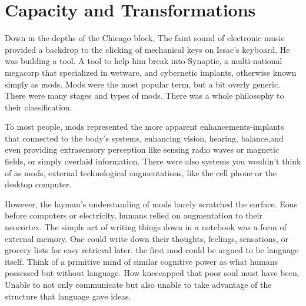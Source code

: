 \chapter{Capacity and Transformations}


Down in the depths of the Chicago block, The faint sound of electronic music provided a backdrop to the clicking of mechanical keys on Issac's keyboard. He was building a tool. A tool to help him break into Synaptic, a multi\hyp{}national megacorp that specialized in wetware, and cybernetic implants, otherwise known simply as mods. Mods were the most popular term, but a bit overly generic. There were many stages and types of mods. There was a whole philosophy to their classification.

To most people, mods represented the more apparent enhancements\hyp{}implants that connected to the body's systems, enhancing vision, hearing, balance,and even providing extrasensory perception like sensing radio waves or magnetic fields, or simply overlaid information. There were also systems you wouldn't think of as mods, external technological augmentations, like the cell phone or the desktop computer.

However, the layman's understanding of mods barely scratched the surface. Eons before computers or electricity, humans relied on augmentation to their neocortex. The simple act of writing things down in a notebook was a form of external memory. One could write down their thoughts, feelings, sensations, or grocery lists for easy retrieval later. the first mod could be argued to be language itself. Think of a primitive mind of similar cognitive power as what humans possessed but without language. How kneecapped that poor soul must have been. Unable to not only communicate but also unable to take advantage of the structure that language gave ideas.
    
